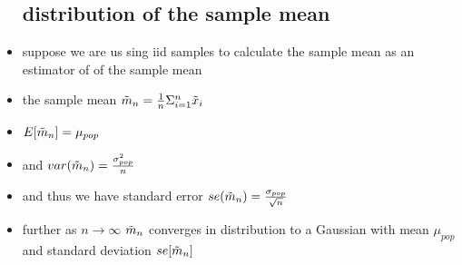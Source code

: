 \documentclass{article}
\begin{document}
\begin{itemize}
\subsection{distribution of the sample mean }
\item suppose we are us sing iid samples to calculate the sample mean as an estimator of of the sample mean 
\item the sample mean $\Tilde{m}_{n}=\frac{1}{n}\Sigma_{i=1}^{n}\Tilde{x}_i$
\item $E[\Tilde{m}_{n}]=\mu_{pop}$
\item and $var(\Tilde{m}_{n})=\frac{\sigma^2_{pop}}{n}$
\item and thus we have standard error $se(\Tilde{m}_{n})=\frac{\sigma_{pop}}{\sqrt{n}}$
\item further as $n\rightarrow \infty$ $\Tilde{m}_{n}$ converges in distribution to a Gaussian with mean $\mu_{pop}$ and standard deviation $se[\Tilde{m}_{n}]$

\end{itemize}
\end{document}
